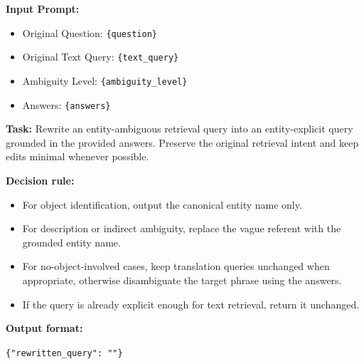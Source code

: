 \documentclass{article} %
\begin{document}
\begin{tcolorbox}[
  title=Example: Oracle Rewrite Prompt,
  coltitle=black,
  colbacktitle=blue!8,
  colback=blue!5,
  colframe=black,
  fonttitle=\bfseries,
  arc=2mm,
  boxrule=0.5pt,
  enhanced jigsaw,
  breakable,
  width=\linewidth,
  left=6pt,
  right=6pt,
  top=6pt,
  bottom=6pt
]

\textbf{Input Prompt:}

\begin{itemize}
  \item Original Question: \texttt{\{question\}}
  \item Original Text Query: \texttt{\{text\_query\}}
  \item Ambiguity Level: \texttt{\{ambiguity\_level\}}
  \item Answers: \texttt{\{answers\}}
\end{itemize}

\textbf{Task:}
Rewrite an entity-ambiguous retrieval query into an entity-explicit query grounded in the provided answers.
Preserve the original retrieval intent and keep edits minimal whenever possible.

\textbf{Decision rule:}
\begin{itemize}
  \item For object identification, output the canonical entity name only.
  \item For description or indirect ambiguity, replace the vague referent with the grounded entity name.
  \item For no-object-involved cases, keep translation queries unchanged when appropriate, otherwise disambiguate the target phrase using the answers.
  \item If the query is already explicit enough for text retrieval, return it unchanged.
\end{itemize}

\textbf{Output format:}

\verb|{"rewritten_query": ""}|
\end{tcolorbox}
\newpage
\end{document}
